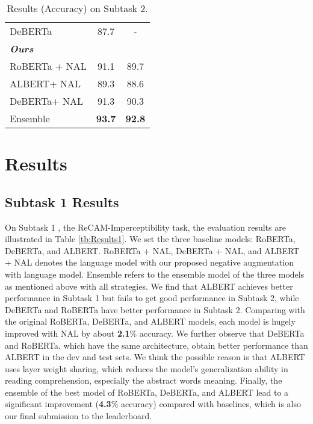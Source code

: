 \documentclass[11pt,a4paper]{article}
\begin{document}
\begin{table}[ht]
\begin{minipage}[t]{0.48\textwidth}
{\begin{tabular}{lcc}
    DeBERTa         & 87.7  & -  \\
    \bf{\textit{Ours}} \\
    RoBERTa + NAL    & 91.1  & 89.7  \\
    ALBERT+ NAL      & 89.3  &  88.6 \\
    DeBERTa+ NAL       & 91.3  & 90.3  \\
    Ensemble                            & \bf93.7  & \bf92.8  \\
    \toprule[1pt]
  \end{tabular}}
  \caption{\label{font-table} Results (Accuracy) on  Subtask 2.}
  \label{tb:Results2}
\end{minipage}
\end{table}

\section{Results}

\subsection{Subtask 1 Results}
On Subtask 1 , the ReCAM-Imperceptibility task, the evaluation results are illustrated in Table \ref{tb:Results1}.
We set the three baseline models: RoBERTa, DeBERTa, and ALBERT.
RoBERTa + NAL, DeBERTa + NAL, and ALBERT + NAL denotes the language model with our proposed negative augmentation with language model.
Ensemble refers to the ensemble model of the three models as mentioned above with all strategies.
We find that ALBERT achieves better performance in Subtask 1 but fails to get good performance in Subtask 2, while DeBERTa and RoBERTa have better performance in Subtask 2.
Comparing with the original RoBERTa, DeBERTa, and ALBERT models, each model is hugely improved with NAL by about \textbf{2.1}\% accuracy.
We further observe that DeBERTa and RoBERTa, which have the same architecture, obtain better performance than ALBERT in the dev and test sets.
We think the possible reason is that ALBERT uses layer weight sharing, which reduces the model's generalization ability in reading comprehension, especially the abstract words meaning.
Finally, the ensemble of the best model of RoBERTa, DeBERTa, and ALBERT lead to a significant improvement (\textbf{4.3}\% accuracy) compared with baselines, which is also our final submission to the leaderboard.
\end{document}
